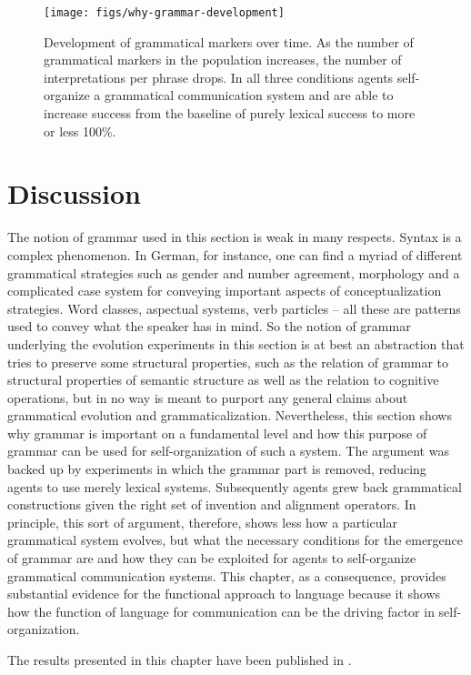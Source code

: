 \begin{figure}
\texttt{[image: figs/why-grammar-development]}
\caption[Development of grammatical markers over time]{Development of grammatical markers over time. As the number of 
grammatical markers in the population
increases, the number of interpretations per phrase drops. In all three
conditions agents self-organize a grammatical communication system and
are able to increase success from the baseline of purely lexical success 
to more or less 100\%.}
\label{f:why-grammar-development}
\end{figure}

\section{Discussion}
The notion of grammar used in this section is weak in many respects. 
Syntax is a complex phenomenon. In German, for instance, one can find 
a myriad of different grammatical strategies such as gender and 
number agreement, morphology and a complicated case system for 
conveying important aspects of conceptualization strategies. 
Word classes, aspectual systems, verb particles -- all these are 
patterns used to convey what the speaker has in mind. So the notion 
of grammar underlying the evolution experiments in this section is at 
best an abstraction that tries to preserve some structural properties, 
such as the relation of grammar to structural properties of semantic structure
as well as the relation to cognitive operations, but in no way is meant to 
purport any general claims about grammatical evolution and grammaticalization. Nevertheless, this section shows why grammar is important on a fundamental 
level and how this purpose of grammar can be used for self-organization of 
such a system. The argument was backed up by experiments in which the 
grammar part is removed, reducing agents to use merely lexical systems.
Subsequently agents grew back grammatical constructions given the right set 
of invention and alignment operators. In principle, this sort of argument, 
therefore, shows less how a particular grammatical system evolves, but what
the necessary conditions for the emergence of grammar are and how they can
be exploited for agents to self-organize grammatical communication systems. 
This chapter, as a consequence, provides substantial evidence for the functional 
approach to language because it shows how the function of language for 
communication can be the driving factor in self-organization.

The results presented in this chapter have been published in 
\cite{spranger2010space,spranger2012grammar}.

%